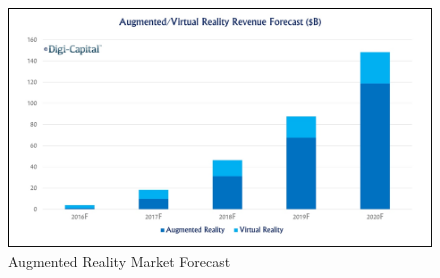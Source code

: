 \begin{figure}[H]
		\includegraphics[width=\textwidth]{../images/ARrevenues.png}
		\centering
		\caption[Augmented Reality Market Forecast]{Augmented Reality Market Forecast\footnotemark}
		\label{fig:Augmented Reality Market Forecast}
\end{figure}
	
